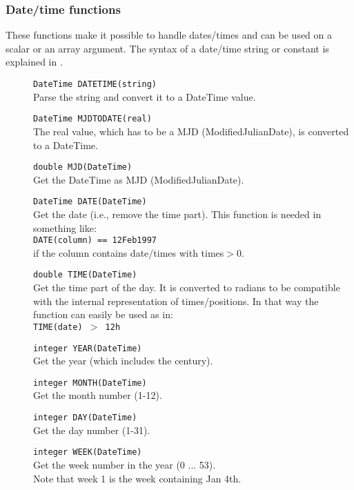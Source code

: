 \subsubsection{Date/time functions}
These functions make it possible to handle dates/times and can be used
on a scalar or an array argument. 
The syntax of a date/time string or constant is explained in
.
\begin{description}
  \item[] \texttt{DateTime DATETIME(string)}\\
       Parse the string and convert it to a DateTime value.
  \item[] \texttt{DateTime MJDTODATE(real)}\\
       The real value, which has to be a MJD (ModifiedJulianDate), is
       converted to a DateTime.
  \item[] \texttt{double MJD(DateTime)}\\
        Get the DateTime as MJD (ModifiedJulianDate).
  \item[] \texttt{DateTime DATE(DateTime)}\\
        Get the date (i.e., remove the time part). This function is
        needed in something like:
       \\\texttt{DATE(column) == 12Feb1997}
       \\if the column contains date/times with times$>$0.
  \item[] \texttt{double TIME(DateTime)}\\
       Get the time part of the day. It is converted to radians to
       be compatible with the internal representation of times/positions.
       In that way the function can easily be used as in:
       \\\texttt{TIME(date) $>$ 12h}
  \item[] \texttt{integer YEAR(DateTime)}\\
        Get the year (which includes the century).
  \item[] \texttt{integer MONTH(DateTime)}\\
        Get the month number (1-12).
  \item[] \texttt{integer DAY(DateTime)}\\
        Get the day number (1-31).
  \item[] \texttt{integer WEEK(DateTime)}\\
        Get the week number in the year (0 ... 53).
        \\Note that week 1 is the week containing Jan 4th.

\end{description}

